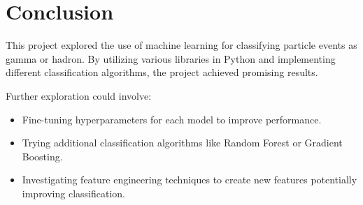 \section{Conclusion}

This project explored the use of machine learning for classifying particle
events as gamma or hadron. By utilizing various libraries in Python and
implementing different classification algorithms, the project achieved
promising results.

Further exploration could involve:

\begin{itemize}
    \item Fine-tuning hyperparameters for each model to improve performance.
    \item Trying additional classification algorithms like Random Forest or
    Gradient Boosting.
    \item Investigating feature engineering techniques to create new features
    potentially improving classification.
\end{itemize}
